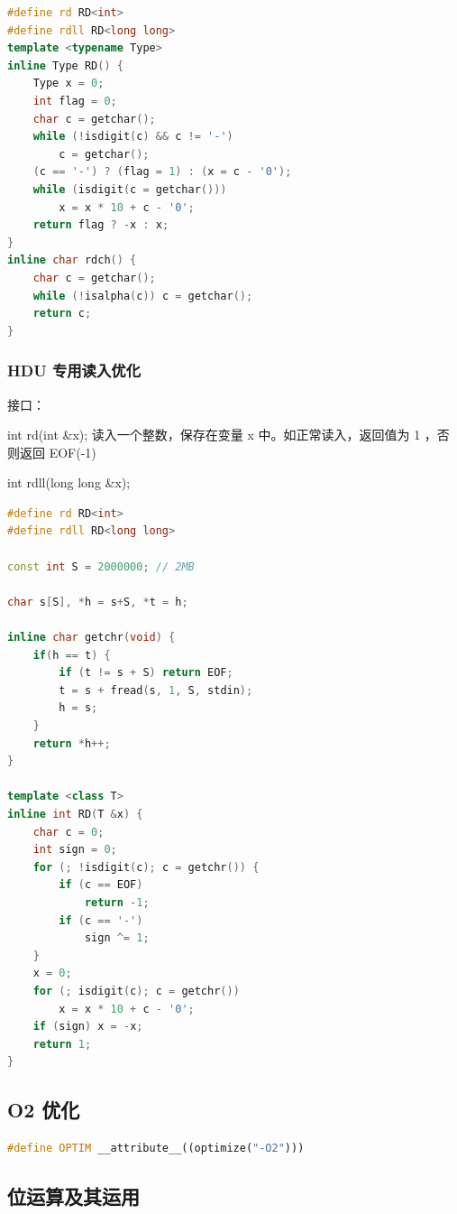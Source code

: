 \documentclass{article}
\begin{document}
\begin{lstlisting}[language=C++]
#define rd RD<int>
#define rdll RD<long long>
template <typename Type>
inline Type RD() {
    Type x = 0;
    int flag = 0;
    char c = getchar();
    while (!isdigit(c) && c != '-')
        c = getchar();
    (c == '-') ? (flag = 1) : (x = c - '0');
    while (isdigit(c = getchar()))
        x = x * 10 + c - '0';
    return flag ? -x : x;
}
inline char rdch() {
    char c = getchar();
    while (!isalpha(c)) c = getchar();
    return c;
}
\end{lstlisting}

\subsubsection{HDU 专用读入优化}

接口：

int rd(int \&x); 读入一个整数，保存在变量 x 中。如正常读入，返回值为 1 ，否则返回 EOF(-1)

int rdll(long long \&x);

\begin{lstlisting}[language=C++]
#define rd RD<int>
#define rdll RD<long long>

const int S = 2000000; // 2MB

char s[S], *h = s+S, *t = h;

inline char getchr(void) {
	if(h == t) {
		if (t != s + S) return EOF;
		t = s + fread(s, 1, S, stdin);
		h = s;
	}
	return *h++;
}

template <class T>
inline int RD(T &x) {
	char c = 0;
	int sign = 0;
	for (; !isdigit(c); c = getchr()) {
		if (c == EOF)
			return -1;
		if (c == '-')
			sign ^= 1;
	}
	x = 0;
	for (; isdigit(c); c = getchr())
		x = x * 10 + c - '0';
	if (sign) x = -x;
	return 1;
}
\end{lstlisting}

\subsection{O2 优化}

\begin{lstlisting}[language=C++]
#define OPTIM __attribute__((optimize("-O2")))
\end{lstlisting}

\subsection{位运算及其运用}
\end{document}
